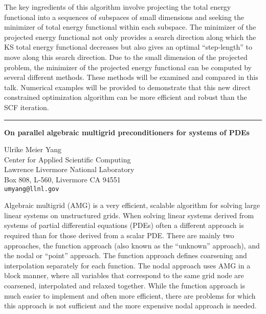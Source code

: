 \documentclass[twosided]{report}
\begin{document}
The key ingredients of this algorithm involve
projecting the total energy functional into a sequences of
subspaces of small dimensions and seeking the minimizer of
total energy functional within each subspace. The minimizer
of the projected energy functional not only provides a
search direction along which the KS total energy functional
decreases but also gives an optimal ``step-length'' to move
along this search direction. Due to the small dimension of
the projected problem, the minimizer of the projected energy
functional can be computed by several different methods.
These methods will be examined and compared in this talk.
Numerical examples will be provided to demonstrate that this
new direct constrained optimization algorithm can be more
efficient and robust than the SCF iteration.



	\begin{center} \rule{6in}{1pt} \end{center}

\begin{center}
{\large			%
{\bf On parallel algebraic multigrid preconditioners for systems of PDEs}}

	Ulrike Meier Yang \\
	Center for Applied Scientific Computing \\
	Lawrence Livermore National Laboratory \\
	Box 808, L-560, Livermore CA 94551 \\
	{\tt umyang@llnl.gov}
\end{center}
Algebraic multigrid (AMG) is a very efficient, scalable
algorithm for solving large linear systems on unstructured
grids. When solving linear systems derived from systems of
partial differential equations (PDEs) often a different
approach is required than for those derived from a scalar
PDE. There are mainly two approaches, the function approach
(also known as the ``unknown'' approach), and the nodal or
``point'' approach. The function approach defines coarsening
and interpolation separately for each function. The nodal
approach uses AMG in a block manner, where all variables
that correspond to the same grid node are coarsened,
interpolated and relaxed together. While the function
approach is much easier to implement and often more
efficient, there are problems for which this approach is not
sufficient and the more expensive nodal approach is needed.
\end{document}
